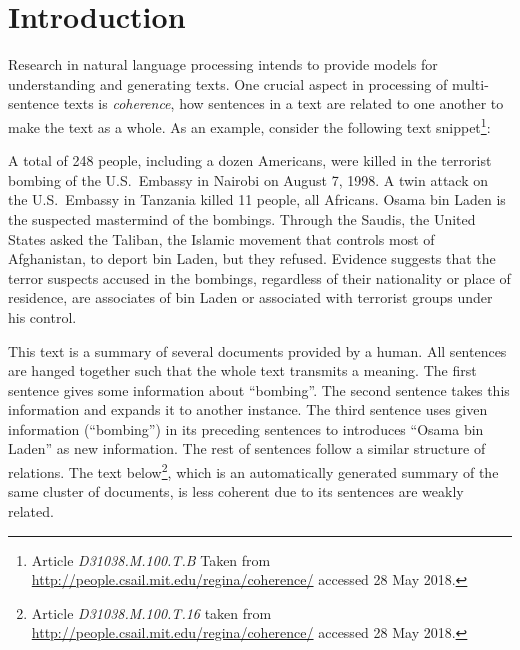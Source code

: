 
\chapter{Introduction}
\label{ch:intro}

Research in natural language processing intends to provide models for understanding and generating texts.   
One crucial aspect in processing of multi-sentence texts is \emph{coherence}, how sentences in a text are related to one another to make the text as a whole. 
As an example, consider the following text snippet\footnote{Article \emph{D31038.M.100.T.B} Taken from \url{http://people.csail.mit.edu/regina/coherence/} accessed 28 May 2018. 
}:

\begin{examples}
A total of 248 people, including a dozen Americans, were killed in the terrorist bombing of the U.S.\ Embassy in Nairobi on August 7, 1998. 
A twin attack on the U.S.\ Embassy in Tanzania killed 11 people, all Africans. 
Osama bin Laden is the suspected mastermind of the bombings. 
Through the Saudis, the United States asked the Taliban, the Islamic movement that controls most of Afghanistan, to deport bin Laden, but they refused. 
Evidence suggests that the terror suspects accused in the bombings, regardless of their nationality or place of residence, are associates of bin Laden or associated with terrorist groups under his control.
\end{examples}

This text is a summary of several documents provided by a human. 
All sentences are hanged together such that the whole text transmits a meaning. 
The first sentence gives some information about ``bombing''. 
The second sentence takes this information and expands it to another instance. 
The third sentence uses given information (``bombing'') in its preceding sentences to introduces ``Osama bin Laden'' as new information. 
The rest of sentences follow a similar structure of relations.  
The text below\footnote{Article \emph{D31038.M.100.T.16} taken from 
\url{http://people.csail.mit.edu/regina/coherence/}
accessed 28 May 2018.}, which is an automatically generated summary of the same cluster of documents, is less coherent due to its sentences are weakly related. 

